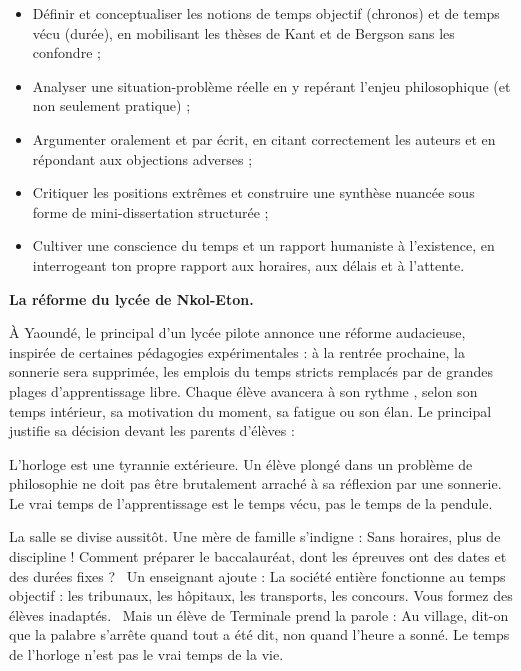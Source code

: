\documentclass[11pt]{article}
\newcommand{\cle}[1]{{\popxbold\color{popdark}#1}}
\newcounter{popsec}
\newcounter{popsub}
\newcommand{\courssub}[1]{%
  \stepcounter{popsub}%
  \par\vspace{9pt}\noindent{\popxbold\fontsize{11.5}{13}\selectfont\color{popink}{\color{poporange}\thepopsec.\thepopsub}\hspace{6pt}#1}\par\nopagebreak\vspace{4pt}
}
\begin{document}
\begin{itemize}
\item \cle{Définir} et \cle{conceptualiser} les notions de temps objectif (\cle{chronos}) et de temps vécu (\cle{durée}), en mobilisant les thèses de Kant et de Bergson sans les confondre ;
\item \cle{Analyser} une situation-problème réelle en y repérant l'enjeu philosophique (et non seulement pratique) ;
\item \cle{Argumenter} oralement et par écrit, en citant correctement les auteurs et en répondant aux objections adverses ;
\item \cle{Critiquer} les positions extrêmes et construire une \cle{synthèse nuancée} sous forme de mini-dissertation structurée ;
\item Cultiver une \cle{conscience du temps} et un rapport humaniste à l'existence, en interrogeant ton propre rapport aux horaires, aux délais et à l'attente.
\end{itemize}

\courssub{Situation}

\textbf{La réforme du lycée de Nkol-Eton.}\par

À Yaoundé, le principal d'un lycée pilote annonce une réforme audacieuse, inspirée de certaines pédagogies expérimentales : à la rentrée prochaine, la sonnerie sera supprimée, les emplois du temps stricts remplacés par de grandes plages d'apprentissage libre. Chaque élève avancera \guillemotleft à son rythme \guillemotright, selon son temps intérieur, sa motivation du moment, sa fatigue ou son élan. Le principal justifie sa décision devant les parents d'élèves :

\guillemotleft L'horloge est une tyrannie extérieure. Un élève plongé dans un problème de philosophie ne doit pas être brutalement arraché à sa réflexion par une sonnerie. Le vrai temps de l'apprentissage est le temps vécu, pas le temps de la pendule. \guillemotright

La salle se divise aussitôt. Une mère de famille s'indigne : \guillemotleft Sans horaires, plus de discipline ! Comment préparer le baccalauréat, dont les épreuves ont des dates et des durées fixes ? \guillemotright\ Un enseignant ajoute : \guillemotleft La société entière fonctionne au temps objectif : les tribunaux, les hôpitaux, les transports, les concours. Vous formez des élèves inadaptés. \guillemotright\ Mais un élève de Terminale prend la parole : \guillemotleft Au village, dit-on que la palabre s'arrête quand tout a été dit, non quand l'heure a sonné. Le temps de l'horloge n'est pas le vrai temps de la vie. \guillemotright
\end{document}
